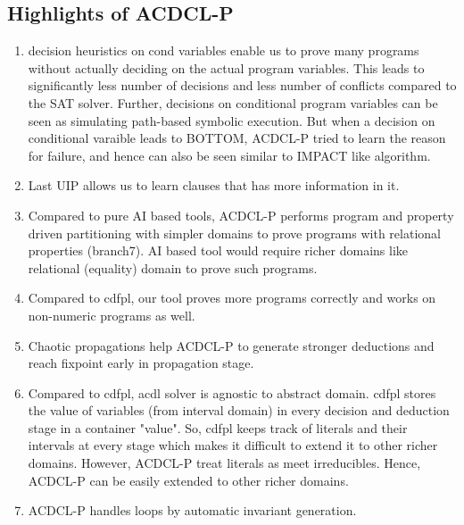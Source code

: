 \documentclass[a4paper,conference]{llncs}
\begin{document}
\subsection{Highlights of ACDCL-P}
\begin{enumerate}
\item decision heuristics on cond variables enable us to prove many 
programs without actually deciding on the actual program variables. This 
leads to significantly less number of decisions and less number of conflicts 
compared to the SAT solver. Further, decisions on conditional program 
variables can be seen as simulating path-based symbolic execution. But when 
a decision on conditional varaible leads to BOTTOM, ACDCL-P tried to learn 
the reason for failure, and hence can also be seen similar to IMPACT like
algorithm. 
\item Last UIP allows us to learn clauses that has more information in it. 
\item Compared to pure AI based tools, ACDCL-P performs program and property 
driven partitioning with simpler domains to prove programs with relational 
properties (branch7). AI based tool would require richer domains like 
relational (equality) domain to prove such programs. 
\item Compared to cdfpl, our tool proves more programs correctly and works on 
non-numeric programs as well.
\item Chaotic propagations help ACDCL-P to generate stronger deductions and reach 
fixpoint early in propagation stage.
\item Compared to cdfpl, acdl solver is agnostic to abstract domain. cdfpl
stores the value of variables (from interval domain) in every decision 
and deduction stage in a container "value". So, cdfpl keeps track of literals 
and their intervals at every stage which makes it difficult to extend it to other 
richer domains. However, ACDCL-P treat literals as meet irreducibles. Hence, 
ACDCL-P can be easily extended to other richer domains.    
\item ACDCL-P handles loops by automatic invariant generation.
\end{enumerate}
\end{document}
